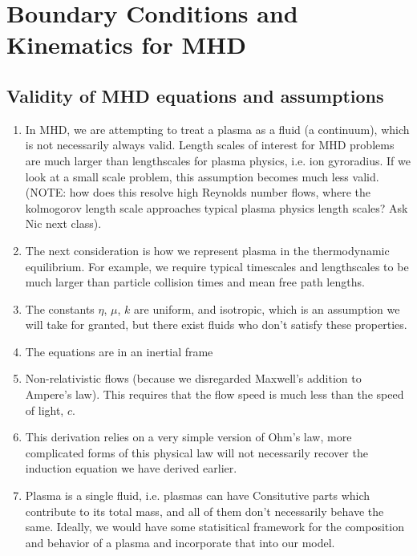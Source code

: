 \documentclass{article}
\begin{document}
\section{Boundary Conditions and Kinematics for MHD}

\subsection{Validity of MHD equations and assumptions}

\begin{enumerate}
\item
In MHD, we are attempting to treat a plasma as a fluid (a continuum), which is
not necessarily always valid. Length scales of interest for MHD problems are
much larger than lengthscales for plasma physics, i.e. ion gyroradius. If we
look at a small scale problem, this assumption becomes much less valid. (NOTE:
how does this resolve high Reynolds number flows, where the kolmogorov length
scale approaches typical plasma physics length scales? Ask Nic next class). 

\item The next consideration is how we represent plasma in the thermodynamic
equilibrium. For example, we require typical timescales and lengthscales to be
much larger than particle collision times and mean free path lengths. 

\item The constants $\eta$, $\mu$, $k$ are uniform, and isotropic, which is an
assumption we will take for granted, but there exist fluids who don't satisfy
these properties. 

\item The equations are in an inertial frame

\item Non-relativistic flows (because we disregarded Maxwell's addition to Ampere's
law). This requires that the flow speed is much less than the speed of light,
$c$. 

\item This derivation relies on a very simple version of Ohm's law, more
complicated forms of this physical law will not necessarily recover the
induction equation we have derived earlier. 

\item Plasma is a single fluid, i.e. plasmas can have Consitutive parts which
contribute to its total mass, and all of them don't necessarily behave the same.
Ideally, we would have some statisitical framework for the composition and
behavior of a plasma and incorporate that into our model. 


\end{enumerate}
\end{document}
